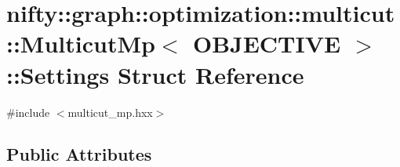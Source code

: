 \hypertarget{structnifty_1_1graph_1_1optimization_1_1multicut_1_1MulticutMp_1_1Settings}{}\section{nifty\+:\+:graph\+:\+:optimization\+:\+:multicut\+:\+:Multicut\+Mp$<$ O\+B\+J\+E\+C\+T\+I\+V\+E $>$\+:\+:Settings Struct Reference}
\label{structnifty_1_1graph_1_1optimization_1_1multicut_1_1MulticutMp_1_1Settings}


{\ttfamily \#include $<$multicut\+\_\+mp.\+hxx$>$}

\subsection*{Public Attributes}
